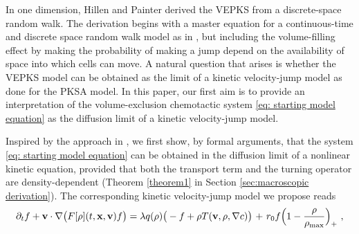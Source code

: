\documentclass{article}
\begin{document}
{In one dimension, Hillen and Painter \cite{painter2002volume} derived the VEPKS from a discrete-space random walk. The derivation begins with a master equation for a continuous-time and discrete space random walk model as in \cite{Othmer1997}, but including the volume-filling effect by making the probability of making a jump depend on the availability of space into which cells can move.  A natural question that arises is whether the VEPKS model can be obtained as the limit of a kinetic velocity-jump model as done for the PKSA model. 
In this paper, our first aim is to provide an interpretation of the volume-exclusion chemotactic system \eqref{eq: starting model equation} as the diffusion limit of a kinetic {{velocity-jump}} model.

Inspired by the approach in \cite{othmer2002diffusion,othmer2000diffusion}, we first show, by formal arguments, that the system \eqref{eq: starting model equation} can be obtained in the diffusion limit of a nonlinear kinetic equation, provided that both the transport term and the turning operator are density-dependent { (Theorem \ref{theorem1} in Section \ref{sec:macroscopic derivation})}. The corresponding kinetic velocity-jump model we propose reads 
\begin{equation}
    \partial_t f+\mathbf{v}\cdot \nabla \big(F[\rho](t,\mathbf{x},\mathbf{v}) f\big)= \lambda q(\rho)\big(-f+\rho T(\mathbf{v},\rho,\nabla c)\big) {\ +\ r_0f\Bigl(1-\frac{\rho}{\rho_{\textnormal{max}}} \Bigr)_+}\ ,\label{eq: inital model without scaling}

\end{equation}}
\end{document}
